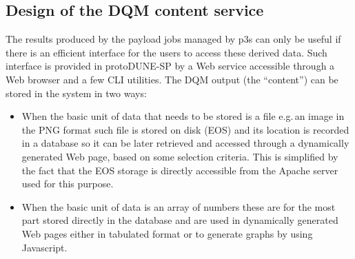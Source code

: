 \documentclass{webofc}
\newcommand{\pd}{protoDUNE\xspace}
\begin{document}


\subsection{Design of the DQM content service}
The results produced by the payload jobs managed by p3s can only be useful if there is an
efficient interface for the users to access these derived data. Such interface is provided in \pd-SP
by a Web service accessible through a Web browser and a few CLI utilities.
The DQM output (the ``content'') can be stored in the system in two ways:
\begin{itemize}

\item When the basic unit of data that needs to be stored is a file e.g.\,an image in the PNG format such
file is stored on disk (EOS) and its location is recorded in a database so it can be later retrieved
and accessed through a dynamically generated Web page,  based on some selection criteria.
This is simplified by the fact that the EOS storage is directly accessible from the Apache server
used for this purpose.

\item When the basic unit of data is an array of numbers these are for the most part stored directly
in the database and are used in dynamically generated Web pages either in tabulated format or
to generate graphs by using Javascript.

\end{itemize}
\end{document}

